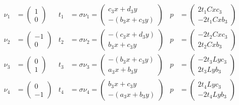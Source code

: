 \documentclass[a4paper,10pt,twoside,final,spanish]{article}
\begin{document}
\begin{enumerate}[a.]
\begin{align*}
\nu_{1} &= \begin{pmatrix}
1 \\
0
\end{pmatrix}
& t_{1} &= \sigma\nu_{1}=\begin{pmatrix}
c_{3}x+d_{3}y \\
-(b_{3}x+c_{3}y)
\end{pmatrix}
& p &= \begin{pmatrix}
2t_{1}Cxc_{3} \\
-2t_{1}Cxb_{3}
\end{pmatrix} \\
\nu_{2} &= \begin{pmatrix}
-1 \\
0
\end{pmatrix}
& t_{2} &= \sigma\nu_{2}=\begin{pmatrix}
-(c_{3}x+d_{3}y) \\
b_{3}x+c_{3}y
\end{pmatrix}
& p &= \begin{pmatrix}
-2t_{2}Cxc_{3} \\
2t_{2}Cxb_{3}
\end{pmatrix} \\
\nu_{3} &= \begin{pmatrix}
0 \\
1
\end{pmatrix}
& t_{3} &= \sigma\nu_{3}=\begin{pmatrix}
-(b_{3}x+c_{3}y) \\
a_{3}x+b_{3}y
\end{pmatrix}
& p &= \begin{pmatrix}
-2t_{3}Lyc_{3} \\
2t_{3}Lyb_{3}
\end{pmatrix} \\
\nu_{4} &= \begin{pmatrix}
0 \\
-1
\end{pmatrix}
& t_{4} &= \sigma\nu_{4}=\begin{pmatrix}
b_{3}x+c_{3}y \\
-(a_{3}x+b_{3}y)
\end{pmatrix}
& p &= \begin{pmatrix}
2t_{4}Lyc_{3} \\
-2t_{4}Lyb_{3}
\end{pmatrix}
\end{align*}

\end{enumerate}
\end{document}
